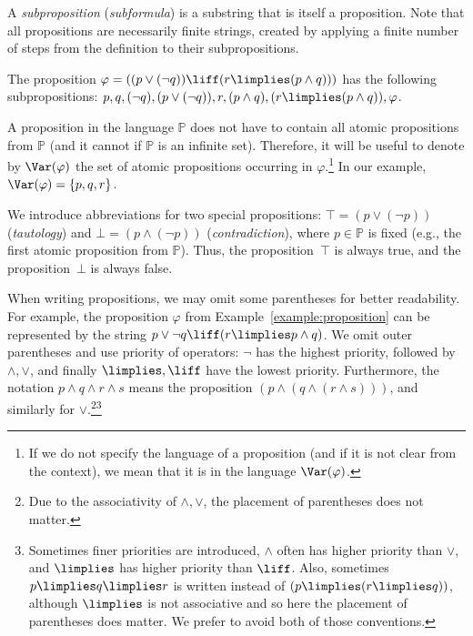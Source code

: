 A \emph{subproposition} (\emph{subformula}) is a substring that is itself a proposition. Note that all propositions are necessarily finite strings, created by applying a finite number of steps from the definition to their subpropositions.

\begin{example}\label{example:proposition}
The proposition $\varphi = ((p \lor (\neg q)) \liff (r \limplies (p \land q)))$ has the following subpropositions: $p, q, (\neg q), (p \lor (\neg q)), r, (p \land q), (r \limplies (p \land q)), \varphi$.
\end{example}

A proposition in the language $\mathbb P$ does not have to contain all atomic propositions from $\mathbb P$ (and it cannot if $\mathbb P$ is an infinite set). Therefore, it will be useful to denote by $\Var(\varphi)$ the set of atomic propositions occurring in $\varphi$.\footnote{If we do not specify the language of a proposition (and if it is not clear from the context), we mean that it is in the language $\Var(\varphi)$.} In our example, $\Var(\varphi)=\{p, q, r\}$.

We introduce abbreviations for two special propositions: $\top = (p \lor (\neg p))$ (\emph{tautology}) and $\bot = (p \land (\neg p))$ (\emph{contradiction}), where $p \in \mathbb P$ is fixed (e.g., the first atomic proposition from $\mathbb P$). Thus, the proposition~$\top$ is always true, and the proposition~$\bot$ is always false.

When writing propositions, we may omit some parentheses for better readability. For example, the proposition $\varphi$ from Example~\ref{example:proposition} can be represented by the string
$p \lor \neg q \liff (r \limplies p \land q)$. We omit outer parentheses and use priority of operators: $\neg$ has the highest priority, followed by $\land, \lor$, and finally $\limplies, \liff$ have the lowest priority. Furthermore, the notation $p \land q \land r \land s$ means the proposition $(p \land (q \land (r \land s)))$, and similarly for $\lor$.\footnote{Due to the associativity of $\land, \lor$, the placement of parentheses does not matter.}\footnote{Sometimes finer priorities are introduced, $\land$ often has higher priority than $\lor$, and $\limplies$ has higher priority than $\liff$. Also, sometimes $p \limplies q \limplies r$ is written instead of $(p \limplies (r \limplies q))$, although $\limplies$ is not associative and so here the placement of parentheses does matter. We prefer to avoid both of those conventions.}


